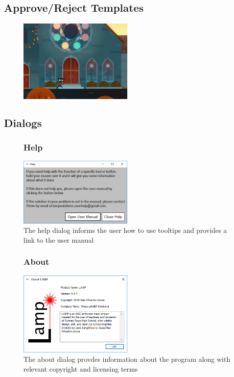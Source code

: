 \documentclass[oneside,openany,11pt,a4paper]{report}
\begin{document}
\subsection{Approve/Reject Templates}
\begin{figure}[H]
	\centering
	\includegraphics[width=0.5\textwidth]{sd10.png}
	\caption{}
\end{figure}


\subsection{Dialogs}
\begin{figure}[H]
	\centering
	\subsubsection{Help}
	\includegraphics[width=0.5\textwidth]{dialog1.png}
	\caption{The help dialog informs the user how to use tooltips  and provides a link to the user manual}
\end{figure}
\begin{figure}[H]
	\centering
	\subsubsection{About}
	\includegraphics[width=0.5\textwidth]{dialog2.png}
	\caption{The about dialog provdes information about the program along with relevant copyright and licensing terms}
\end{figure}
\end{document}
